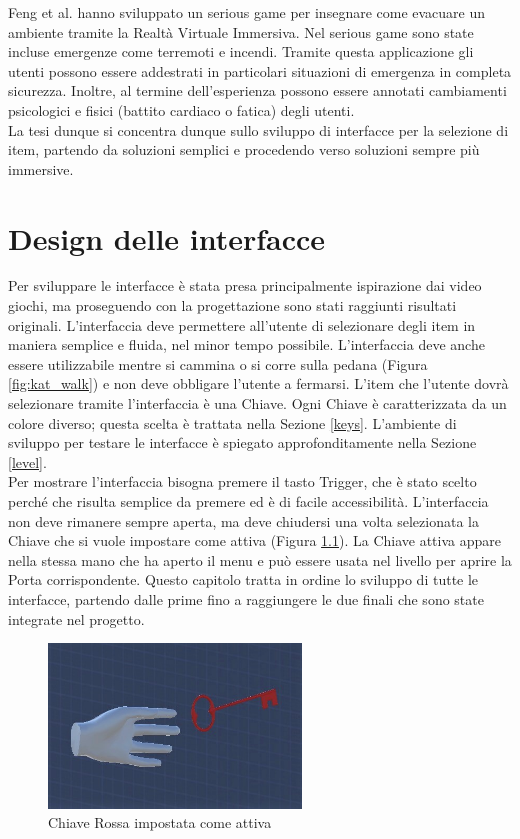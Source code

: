 \documentclass[target=bach,aauheader=]{thud}
\begin{document}
Feng et al. \cite{Feng} hanno sviluppato un serious game per insegnare come evacuare un ambiente tramite la Realtà Virtuale Immersiva.
Nel serious game sono state incluse emergenze come terremoti e incendi. 
Tramite questa applicazione gli utenti possono essere addestrati in particolari situazioni di emergenza in completa sicurezza.
Inoltre, al termine dell'esperienza possono essere annotati cambiamenti psicologici e fisici (battito cardiaco o fatica) degli utenti. \\

La tesi dunque si concentra dunque sullo sviluppo di interfacce per la selezione di item, partendo da soluzioni semplici e procedendo verso soluzioni sempre più immersive. 

\chapter{Design delle interfacce} %
\label{design}

Per sviluppare le interfacce è stata presa principalmente ispirazione dai video giochi, ma proseguendo con la progettazione sono stati raggiunti risultati originali. 
L'interfaccia deve permettere all'utente di selezionare degli item in maniera semplice e fluida, nel minor tempo possibile.
L'interfaccia deve anche essere utilizzabile mentre si cammina o si corre sulla pedana (Figura \ref{fig:kat_walk}) e non deve obbligare l'utente a fermarsi.
L'item che l'utente dovrà selezionare tramite l'interfaccia è una Chiave.
Ogni Chiave è caratterizzata da un colore diverso; questa scelta è trattata nella Sezione \ref{keys}.
L'ambiente di sviluppo per testare le interfacce è spiegato approfonditamente nella Sezione \ref{level}. \\

Per mostrare l'interfaccia bisogna premere il tasto Trigger, che è stato scelto perché che risulta semplice da premere ed è di facile accessibilità.  
L'interfaccia non deve rimanere sempre aperta, ma deve chiudersi una volta selezionata la Chiave che si vuole impostare come attiva (Figura \ref{fig:key_red}).
La Chiave attiva appare nella stessa mano che ha aperto il menu e può essere usata nel livello per aprire la Porta corrispondente.
Questo capitolo tratta in ordine lo sviluppo di tutte le interfacce, partendo dalle prime fino a raggiungere le due finali che sono state integrate nel progetto.

\begin{figure}[h]
    \centering
    \includegraphics[width=0.60\textwidth]{key_red}
    \caption{Chiave Rossa impostata come attiva}
    \label{fig:key_red}
\end{figure}
\end{document}

